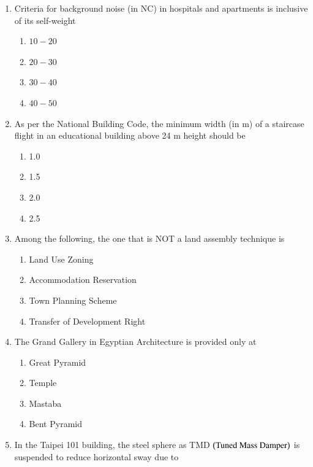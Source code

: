 \documentclass[journal,12pt,onecolumn]{IEEEtran}
\theoremstyle{remark}
\begin{document}
\begin{enumerate}
\item Criteria for background noise (in NC) in hospitals and apartments is inclusive of its self-weight

\hfill{}
\begin{enumerate}
\item $10-20$
\item $20-30$
\item $30-40$
\item $40-50$
\end{enumerate}

\item As per the National Building Code, the minimum width (in m) of a staircase flight in an educational building above 24 m height should be

\hfill{}
\begin{enumerate}
\item 1.0
\item 1.5
\item 2.0
\item 2.5
\end{enumerate}

\item Among the following, the one that is NOT a land assembly technique is

\hfill{}
\begin{enumerate}
\item Land Use Zoning
\item Accommodation Reservation
\item Town Planning Scheme
\item Transfer of Development Right
\end{enumerate}

\item The Grand Gallery in Egyptian Architecture is provided only at

\hfill{}
\begin{enumerate}
\item Great Pyramid
\item Temple
\item Mastaba
\item Bent Pyramid
\end{enumerate}

\item In the Taipei 101 building, the steel sphere as TMD $\brak{\text{Tuned Mass Damper}}$ is suspended to reduce horizontal sway due to


\end{enumerate}
\end{document}
